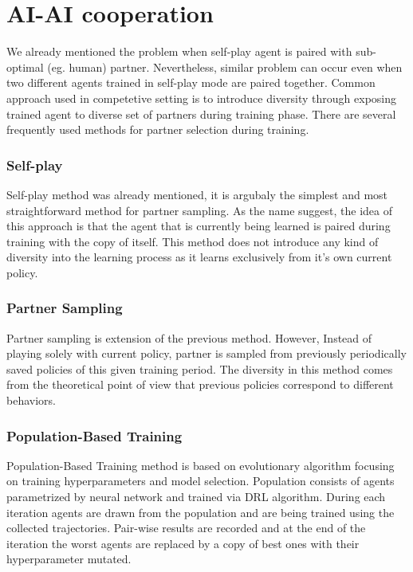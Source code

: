 \section{AI-AI cooperation}\label{aiaicooperation}
We already mentioned the problem when self-play agent is paired with sub-optimal (eg. human) partner.
Nevertheless, similar problem can occur even when two different agents trained in self-play mode are paired together.
Common approach used in competetive setting is to introduce diversity through exposing trained agent to diverse set of partners during training phase.
There are several frequently used methods for partner selection during training.

\subsubsection*{Self-play}\label{selfplayMethod}
Self-play method was already mentioned, it is argubaly the simplest and most straightforward method for partner sampling.
As the name suggest, the idea of this approach is that the agent that is currently being learned is paired during training with the copy of itself.
This method does not introduce any kind of diversity into the learning process as it learns exclusively from it's own current policy.

\subsubsection*{Partner Sampling}
Partner sampling is extension of the previous method. 
However, Instead of playing solely with current policy, partner is sampled from previously periodically saved policies of this given training period.
The diversity in this method comes from the theoretical point of view that previous policies correspond to different behaviors.

\subsubsection*{Population-Based Training}
Population-Based Training method is based on evolutionary algorithm focusing on training hyperparameters and model selection.
Population consists of agents parametrized by neural network and trained via DRL algorithm.
During each iteration agents are drawn from the population and are being trained using the collected trajectories.
Pair-wise results are recorded and at the end of the iteration the worst agents are replaced by a copy of best ones with their hyperparameter mutated.


